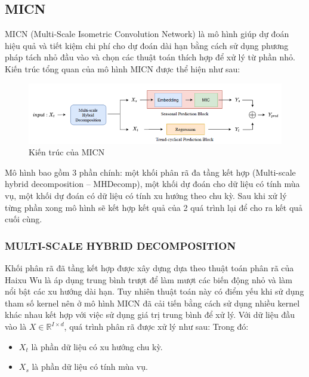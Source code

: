 \documentclass[conference]{IEEEtran}
\begin{document}
\subsection{MICN}
MICN (Multi-Scale Isometric Convolution Network) là mô hình giúp dự đoán hiệu quả và tiết kiệm chi phí cho dự đoán dài hạn bằng cách sử dụng phương pháp tách nhỏ đầu vào và chọn các thuật toán thích hợp để xử lý từ phần nhỏ. Kiến trúc tổng quan của mô hình MICN được thể hiện như sau: \cite{MICN}
\begin{figure}[H]
    \centering
    \begin{minipage}{0.8\linewidth}
    \centering
        \includegraphics[width=\linewidth]{images/MICN.png}
    \caption{Kiến trúc của MICN}
    \label{fig11}
    \end{minipage}
\end{figure}
Mô hình bao gồm 3 phần chính: một khối phân rã đa tầng kết hợp (Multi-scale hybrid decomposition – MHDecomp), một khối dự đoán cho dữ liệu có tính mùa vụ, một khối dự đoán có dữ liệu có tính xu hướng theo chu kỳ. Sau khi xử lý từng phần xong mô hình sẽ kết hợp kết quả của 2 quá trình lại để cho ra kết quả cuối cùng.

\subsubsection{MULTI-SCALE HYBRID DECOMPOSITION}
Khối phân rã đã tầng kết hợp được xây dựng dựa theo thuật toán phân rã của Haixu Wu là áp dụng trung bình trượt để làm mượt các biến động nhỏ và làm nổi bật các xu hướng dài hạn. Tuy nhiên thuật toán này có điểm yếu khi sử dụng tham số kernel nên ở mô hình MICN đã cải tiến bằng cách sử dụng nhiều kernel khác nhau kết hợp với việc sử dụng giá trị trung bình để xử lý. Với dữ liệu đầu vào là \( X \in \mathbb{R}^{I \times d} \), quá trình phân rã được xử lý như sau:
Trong đó:
\begin{itemize}
    \item \( X_t \) là phần dữ liệu có xu hướng chu kỳ.
    \item \( X_s \) là phần dữ liệu có tính mùa vụ.
\end{itemize}
\end{document}
